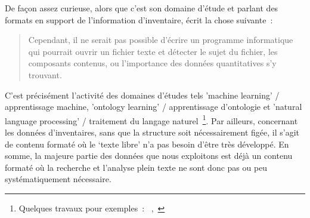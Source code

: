De façon assez curieuse, alors que c'est son domaine d'étude et parlant des formats en support de l'information d'inventaire, \citeauthor{sayan_contribution_2011} écrit la chose suivante~:
\blockcquote[traduction]{sayan_contribution_2011}{
Cependant, il ne serait pas possible d'écrire un programme informatique qui pourrait ouvrir un fichier texte et détecter le sujet du fichier, les composants contenus, ou l'importance des données quantitatives s'y trouvant.
}
C'est précisément l'activité des domaines d'études tels 'machine learning' / apprentissage machine, 'ontology learning' / apprentissage d'ontologie et 'natural language processing' / traitement du langage naturel~\footnote{Quelques travaux pour exemples~: ~\cite{abdi_representation_2014},~\cite{heinecke_generation_2006}}.
Par ailleurs, concernant les données d'inventaires, sans que la structure soit nécessairement figée, il s'agit de contenu formaté où le `texte libre' n'a pas besoin d'être très développé.
En somme, la majeure partie des données que nous exploitons est déjà un contenu formaté où la recherche et l'analyse plein texte ne sont donc pas ou peu systématiquement nécessaire.

